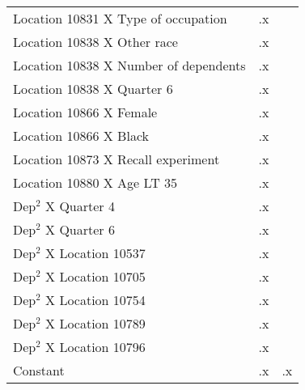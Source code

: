 \begin{tabular}{l*{2}{c}}
Location 10831 X Type of occupation&          .x&            \\
Location 10838 X Other race&          .x&            \\
Location 10838 X Number of dependents&          .x&            \\
Location 10838 X Quarter 6&          .x&            \\
Location 10866 X Female&          .x&            \\
Location 10866 X Black&          .x&            \\
Location 10873 X Recall experiment&          .x&            \\
Location 10880 X Age LT 35&          .x&            \\
Dep$^2$ X Quarter 4 &          .x&            \\
Dep$^2$ X Quarter 6 &          .x&            \\
Dep$^2$ X Location 10537&          .x&            \\
Dep$^2$ X Location 10705&          .x&            \\
Dep$^2$ X Location 10754&          .x&            \\
Dep$^2$ X Location 10789&          .x&            \\
Dep$^2$ X Location 10796&          .x&            \\
Constant            &          .x&          .x\\
\hline\hline
\end{tabular}
